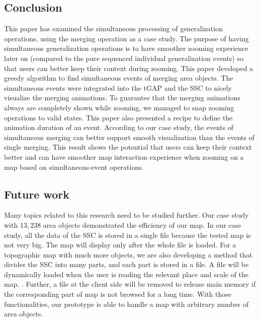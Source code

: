 \documentclass[twocolumn]{svjour3}          %
\begin{document}
\subsection{Conclusion}
This paper has examined the simultaneous processing 
of generalization operations,
using the merging operation as a case study. 
The purpose of having simultaneous generalization operations 
is to have smoother zooming experience later on 
(compared to the pure sequenced individual generalization events)
so that users can better keep their context during zooming.
This paper developed a greedy algorithm to find simultaneous events of 
merging area objects.
The simultaneous events were integrated into 
the tGAP and the SSC to nicely visualize the merging animations.
To guarantee that the merging animations always are completely shown while zooming, 
we managed to snap zooming operations to valid states.
This paper also presented a recipe 
to define the animation duration of an event.
According to our case study,
the events of simultaneous merging 
can better support smooth visualization than the events of single merging.
This result shows the potential that
users can keep their context better 
and can have smoother map interaction experience
when zooming on a map based on simultaneous-event operations.



\subsection{Future work}

Many topics related to this research need to be studied further.
Our case study with $13{,}238$ area objects 
demonstrated the efficiency of our map.
In our case study, all the data of the SSC is stored in a single file
because the tested map is not very big.
The map will display only after the whole file is loaded.
For a topographic map with much more objects,
we are also developing a method that divides the SSC into many parts, 
and each part is stored in a file.
A file will be dynamically loaded 
when the user is reading the relevant place and scale of the map.
.
Further, a file at the client side will be removed to release main memory
if the corresponding part of map is not browsed for a long time. 
With those functionalities, our prototype is able to handle 
a map with arbitrary number of area objects.
\end{document}
